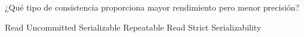 \question[1] ¿Qué tipo de consistencia proporciona mayor rendimiento pero menor precisión?
\begin{choices}
\CorrectChoice Read Uncommitted
\choice Serializable
\choice Repeatable Read
\choice Strict Serializability
\end{choices}